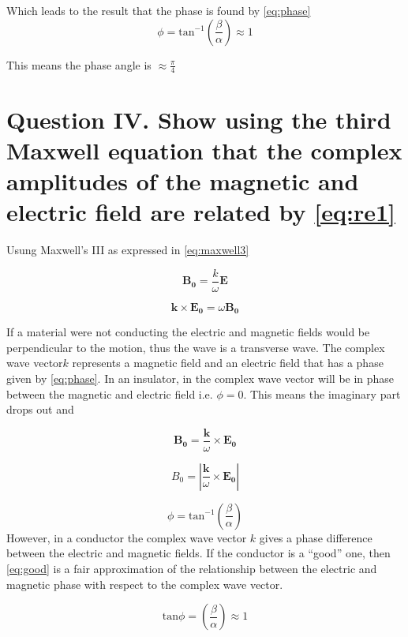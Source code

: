 \documentclass[12pt]{article}
\begin{document}
Which leads to the result that the phase is found by \cref{eq:phase}
\begin{equation}
\label{eq:phaseConductor}
\phi=\mathrm{tan}^{-1}\left(\frac{\beta}{\alpha}\right)\approx 1
\end{equation}

This means the phase angle is $\approx\frac{\pi}{4}$








\section*{Question IV. Show using the third Maxwell equation that the complex amplitudes of the magnetic and electric field are related by \cref{eq:re1}}


Usung Maxwell's III as expressed in \cref{eq:maxwell3}

\begin{equation}
\label{eq:re1}
\mathbf{B_{0}}=\frac{k}{\omega} \mathbf{E}
\end{equation}

\begin{equation}
\label{eq:re2}
\mathbf{k}\times\mathbf{E_{0}}=\omega \mathbf{B_{0}}
\end{equation}


If a material were not conducting the electric and magnetic fields would be perpendicular to the motion, thus the wave is a transverse wave. The complex wave  vector$k$
represents a magnetic field and an electric field that has a phase given by \cref{eq:phase}. In an insulator, in the complex wave vector will be in phase between the magnetic and electric field i.e. $\phi=0$. This means the imaginary part drops out and  

\begin{equation}
\label{eq:re3}
\mathbf{B_{0}}=\frac{\mathbf{k}}{\omega } \times\mathbf{E_{0}}
\end{equation}


\begin{equation}
\label{eq:re2}
B_{0}=\left|\frac{\mathbf{k}}{\omega } \times\mathbf{E_{0}}\right |
\end{equation}

\begin{equation}
\label{eq:phase}
\phi=\mathrm{tan}^{-1}\left(\frac{\beta}{\alpha}\right)
\end{equation}
However, in a conductor the complex wave vector $k$ gives a phase difference between the electric and magnetic fields. If the conductor is a \enquote{good} one, then \cref{eq:good} is a fair approximation of the relationship between the electric and magnetic phase with respect to the complex wave vector. 

\begin{equation}
\label{eq:good}
\mathrm{tan}{\phi}=\left(\frac{\beta}{\alpha}\right)\approx 1
\end{equation}
\end{document}
